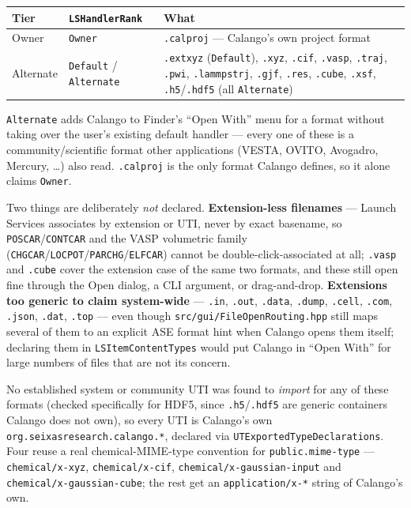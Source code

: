 \documentclass[11pt,a4paper]{article}
\newcommand{\file}[1]{\texttt{#1}}
\newcommand{\opt}[1]{\texttt{#1}}
\begin{document}
\begin{center}
\small
\begin{tabular}{@{}llp{}@{}}
\toprule
Tier & \opt{LSHandlerRank} & What \\
\midrule
Owner & \opt{Owner} & \file{.calproj} --- Calango's own project format \\
Alternate & \opt{Default} / \opt{Alternate} &
  \file{.extxyz} (\opt{Default}), \file{.xyz}, \file{.cif}, \file{.vasp},
  \file{.traj}, \file{.pwi}, \file{.lammpstrj}, \file{.gjf}, \file{.res},
  \file{.cube}, \file{.xsf}, \file{.h5}/\file{.hdf5} (all \opt{Alternate}) \\
\bottomrule
\end{tabular}
\end{center}

\noindent \opt{Alternate} adds Calango to Finder's ``Open With'' menu for a
format without taking over the user's existing default handler --- every one
of these is a community/scientific format other applications (VESTA, OVITO,
Avogadro, Mercury, \ldots) also read. \file{.calproj} is the only format
Calango defines, so it alone claims \opt{Owner}.

Two things are deliberately \emph{not} declared. \textbf{Extension-less
filenames} --- Launch Services associates by extension or UTI, never by exact
basename, so \file{POSCAR}/\file{CONTCAR} and the VASP volumetric family
(\file{CHGCAR}/\file{LOCPOT}/\file{PARCHG}/\file{ELFCAR}) cannot be
double-click-associated at all; \file{.vasp} and \file{.cube} cover the
extension case of the same two formats, and these still open fine through
the Open dialog, a CLI argument, or drag-and-drop. \textbf{Extensions too
generic to claim system-wide} --- \file{.in}, \file{.out}, \file{.data},
\file{.dump}, \file{.cell}, \file{.com}, \file{.json}, \file{.dat},
\file{.top} --- even though \file{src/gui/FileOpenRouting.hpp} still maps
several of them to an explicit ASE format hint when Calango opens them
itself; declaring them in \opt{LSItemContentTypes} would put Calango in
``Open With'' for large numbers of files that are not its concern.

No established system or community UTI was found to \emph{import} for any of
these formats (checked specifically for HDF5, since \file{.h5}/\file{.hdf5}
are generic containers Calango does not own), so every UTI is Calango's own
\texttt{org.seixasresearch.calango.*}, declared via
\opt{UTExportedTypeDeclarations}. Four reuse a real chemical-MIME-type
convention for \opt{public.mime-type} --- \texttt{chemical/x-xyz},
\texttt{chemical/x-cif}, \texttt{chemical/x-gaussian-input} and
\texttt{chemical/x-gaussian-cube}; the rest get an \texttt{application/x-*}
string of Calango's own.
\end{document}
